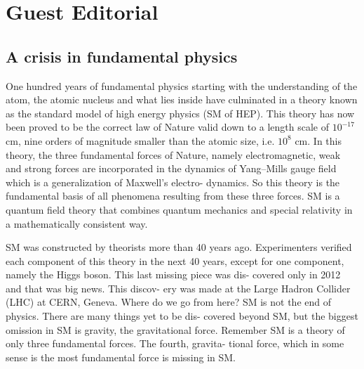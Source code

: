 \chapter[GUEST EDITORIAL]{Guest Editorial}\label{chap13}




\section*{A crisis in fundamental physics}

One hundred years of fundamental physics starting with
the understanding of the atom, the atomic nucleus and
what lies inside have culminated in a theory known as the
standard model of high energy physics (SM of HEP).
This theory has now been proved to be the correct law of
Nature valid down to a length scale of $10^{-17}$ cm, nine
orders of magnitude smaller than the atomic size, i.e.
$10^{8}$ cm. In this theory, the three fundamental forces of
Nature, namely electromagnetic, weak and strong forces
are incorporated in the dynamics of Yang–Mills gauge
field which is a generalization of Maxwell’s electro-
dynamics. So this theory is the fundamental basis of all
phenomena resulting from these three forces. SM is a
quantum field theory that combines quantum mechanics
and special relativity in a mathematically consistent way.

SM was constructed by theorists more than 40 years
ago. Experimenters verified each component of this
theory in the next 40 years, except for one component,
namely the Higgs boson. This last missing piece was dis-
covered only in 2012 and that was big news. This discov-
ery was made at the Large Hadron Collider (LHC) at
CERN, Geneva. Where do we go from here? SM is not
the end of physics. There are many things yet to be dis-
covered beyond SM, but the biggest omission in SM is
gravity, the gravitational force. Remember SM is a theory
of only three fundamental forces. The fourth, gravita-
tional force, which in some sense is the most fundamental
force is missing in SM.

